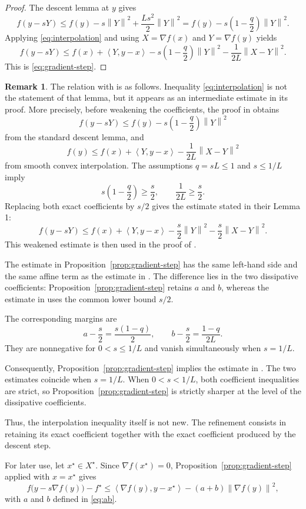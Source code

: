 \documentclass[11pt]{article}
\theoremstyle{plain}
\theoremstyle{definition}
\newtheorem{remark}[theorem]{Remark}
\newcommand{\norm}[1]{\left\lVert #1\right\rVert}
\newcommand{\inner}[2]{\left\langle #1,#2\right\rangle}
\begin{document}
\begin{proof}
The descent lemma at $y$ gives
$$
f(y-sY)
\leq f(y)-s\norm{Y}^2+\frac{Ls^2}{2}\norm{Y}^2
=f(y)-s\left(1-\frac q2\right)\norm{Y}^2.
$$
Applying \eqref{eq:interpolation} and using
$X=\nabla f(x)$ and $Y=\nabla f(y)$ yields
$$
f(y-sY)
\leq f(x)+\inner{Y}{y-x}
-s\left(1-\frac q2\right)\norm{Y}^2
-\frac{1}{2L}\norm{X-Y}^2.
$$
This is \eqref{eq:gradient-step}.
\end{proof}
\begin{remark}\normalfont
The relation with \cite[Appendix~A.1, Lemma~1]{AFCR2022} is as follows. Inequality \eqref{eq:interpolation} is not
the statement of that lemma, but it appears as an intermediate estimate in its proof. More precisely, before weakening the coefficients, the
proof in \cite{AFCR2022} obtains
$$
f(y-sY)
\leq f(y)-s\left(1-\frac q2\right)\norm{Y}^2
$$
from the standard descent lemma, and
$$
f(y)\leq f(x)+\inner{Y}{y-x}
-\frac{1}{2L}\norm{X-Y}^2
$$
from smooth convex interpolation. The assumptions $q=sL\leq1$ and
$s\leq1/L$ imply
$$
s\left(1-\frac q2\right)\geq\frac s2,
\qquad
\frac{1}{2L}\geq\frac s2.
$$
Replacing both exact coefficients by $s/2$ gives the estimate stated in their Lemma 1:
$$
f(y-sY)
\leq f(x)+\inner{Y}{y-x}
-\frac s2\norm{Y}^2
-\frac s2\norm{X-Y}^2.
$$
This weakened estimate is then used in the proof of
\cite[Theorem~6]{AFCR2022}.

{The estimate in Proposition~\ref{prop:gradient-step} has the same left-hand side and the same affine term as the estimate in
\cite[Appendix~A.1, Lemma~1]{AFCR2022}. The difference lies in the two dissipative coefficients: Proposition~\ref{prop:gradient-step} retains
$a$ and $b$, whereas the estimate in \cite{AFCR2022} uses the common lower bound $s/2$.}

The corresponding margins are
\begin{equation}
\label{eq:margins}
a-\frac s2=\frac{s(1-q)}{2},
\qquad
b-\frac s2=\frac{1-q}{2L}.
\end{equation}
They are nonnegative for $0<s\leq1/L$ and vanish simultaneously when $s=1/L$.

{Consequently, Proposition~\ref{prop:gradient-step} implies the estimate in \cite[Appendix~A.1, Lemma~1]{AFCR2022}. The two estimates
coincide when $s=1/L$. When $0<s<1/L$, both coefficient inequalities are strict, so Proposition~\ref{prop:gradient-step} is strictly sharper at
the level of the dissipative coefficients.}

Thus, the interpolation inequality itself is not new. The refinement consists in retaining its exact coefficient together with the exact
coefficient produced by the descent step.

For later use, let $x^\star\in X^\star$. Since $\nabla f(x^\star)=0$, Proposition~\ref{prop:gradient-step} applied with $x=x^\star$ gives
\begin{equation}
\label{eq:gradient-step-minimizer}
f\bigl(y-s\nabla f(y)\bigr)-f^\star
\leq
\inner{\nabla f(y)}{y-x^\star}
-(a+b)\norm{\nabla f(y)}^2,
\end{equation}
with $a$ and $b$ defined in \eqref{eq:ab}.
\end{remark}
\end{document}
